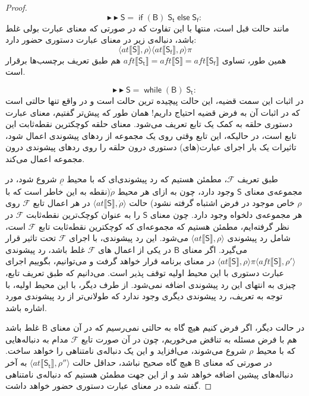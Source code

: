 \begin{proof}
$$\blacktriangleright\blacktriangleright \mathsf{S=\; if\;(B)\;S_t\;else\;S_f}:$$
مانند حالت قبل است، منتها با این تفاوت که در صورتی که معنای عبارت بولی غلط باشد، دنباله‌ی زیر در معنای عبارت‌ دستوری حضور دارد:
	$$\langle at \llbracket \mathsf{S} \rrbracket , \rho \rangle
\langle at \llbracket \mathsf{S_f} \rrbracket , \rho \rangle \pi$$
همین ‌طور، تساوی 
$aft \llbracket \mathsf{S_t} \rrbracket=aft \llbracket \mathsf{S} \rrbracket=aft \llbracket \mathsf{S_f} \rrbracket$
هم طبق تعریف برچسب‌ها برقرار است.

$$\blacktriangleright\blacktriangleright \mathsf{S=\; while\;(B)\;S_t}:$$
در اثبات این سمت قضیه، این حالت پیچیده ترین حالت است و در واقع تنها حالتی است که در اثبات آن به فرض قضیه احتیاج داریم! همان طور که پیش‌تر گفتیم، معنای عبارت دستوری حلقه به کمک یک تابع تعریف می‌شود. معنای حلقه کوچکترین نقطه‌ثابت این تابع است، در حالیکه، این تابع وقتی روی یک مجموعه از ردهای پیشوندی اعمال شود، تاثیرات یک بار اجرای عبارت‌(های) دستوری درون حلقه را روی ردهای پیشوندی درون مجموعه اعمال می‌کند.

طبق تعریف $\mathcal{F}$، مطمئن هستیم که رد پیشوندی‌ای که با محیط $\underline{\rho}$ شروع شود، در مجموعه‌ی معنای $\mathsf{S}$ وجود دارد، چون به ازای هر محیط $\dot{\rho}$(نقطه به این خاطر است که با $\rho$ خاص موجود در فرض اشتباه گرفته نشود) حالت 
$\langle at \llbracket \mathsf{S} \rrbracket, \dot{\rho} \rangle$
 در هر اعمال تابع $\mathcal{F}$ روی هر مجموعه‌ی دلخواه وجود دارد. چون معنای $\mathsf{S}$ را به عنوان کوچک‌ترین نقطه‌ثابت $\mathcal{F}$ در نظر گرفته‌ایم، مطمئن هستیم که مجموعه‌ای که کوچکترین نقطه‌ثابت تابع $\mathcal{F}$ است، شامل رد پیشوندی 
 $\langle at \llbracket \mathsf{S} \rrbracket, \rho \rangle$
 می‌شود. این رد پیشوندی، با اجرای $\mathcal{F}$ تحت تاثیر قرار می‌گیرد. اگر معنای $\mathsf{B}$ در یکی از اعمال های $\mathcal{F}$ غلط باشد، رد پیشوندی
$ \langle at \llbracket \mathsf{S} \rrbracket, \rho \rangle \pi \langle aft \llbracket \mathsf{S} \rrbracket , \rho' \rangle$ 
در معنای برنامه قرار خواهد گرفت و می‌توانیم، بگوییم اجرای عبارت‌ دستوری با این محیط اولیه توقف پذیر است. می‌دانیم که طبق تعریف تابع، چیزی به انتهای این رد پیشوندی اضافه نمی‌شود. از طرف دیگر، با این محیط اولیه، با توجه به تعریف، رد پیشوندی دیگری وجود ندارد که طولانی‌تر از رد پیشوندی مورد اشاره باشد. 

در حالت دیگر، اگر فرض کنیم هیچ گاه به حالتی نمی‌رسیم که در آن معنای $\mathsf{B}$ غلط باشد هم با فرض مسئله به تناقض می‌خوریم، چون در آن صورت تابع $\mathcal{F}$ مدام به دنباله‌‌هایی که با محیط $\rho$ شروع می‌شوند، می‌افزاید و این یک دنباله‌ی نامتناهی را خواهد ساخت. در صورتی که معنای $\mathsf{B}$ هیچ گاه صحیح نباشد، حداقل حالت 
$\langle at \llbracket \mathsf{S_t} \rrbracket , \rho'' \rangle$
به آخر دنباله‌های پیشین اضافه خواهد شد و از این جهت مطمئن هستیم که دنباله‌ی نامتناهی گفته شده در معنای عبارت‌ دستوری حضور خواهد داشت. 


\end{proof}

